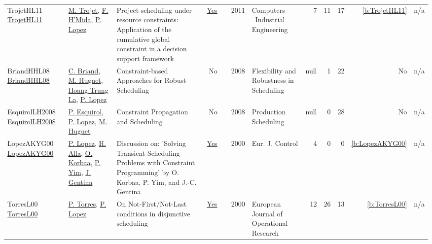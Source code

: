 {\begin{longtable}{>{\raggedright\arraybackslash}p{3cm}>{\raggedright\arraybackslash}p{6cm}>{\raggedright\arraybackslash}p{6.5cm}rrrp{2.5cm}rrrrr}
TrojetHL11 \href{https://doi.org/10.1016/j.cie.2010.08.014}{TrojetHL11} & \hyperref[auth:a711]{M. Trojet}, \hyperref[auth:a712]{F. H'Mida}, \hyperref[auth:a3]{P. Lopez} & Project scheduling under resource constraints: Application of the cumulative global constraint in a decision support framework & \href{../works/TrojetHL11.pdf}{Yes} & \cite{TrojetHL11} & 2011 & Computers \  Industrial Engineering & 7 & 11 & 17 & \ref{b:TrojetHL11} & n/a\\
BriandHHL08 \href{http://dx.doi.org/10.1002/9780470611432.ch9}{BriandHHL08} & \hyperref[auth:a1218]{C. Briand}, \hyperref[auth:a1219]{M. Huguet}, \hyperref[auth:a1220]{Hoang Trung La}, \hyperref[auth:a3]{P. Lopez} & Constraint-based Approaches for Robust Scheduling & No & \cite{BriandHHL08} & 2008 & Flexibility and Robustness in Scheduling & null & 1 & 22 & No & n/a\\
EsquirolLH2008 \href{http://dx.doi.org/10.1002/9780470611050.ch5}{EsquirolLH2008} & \hyperref[auth:a1270]{P. Esquirol}, \hyperref[auth:a3]{P. Lopez}, \hyperref[auth:a1219]{M. Huguet} & Constraint Propagation and Scheduling & No & \cite{EsquirolLH2008} & 2008 & Production Scheduling & null & 0 & 28 & No & n/a\\
LopezAKYG00 \href{https://doi.org/10.1016/S0947-3580(00)71114-9}{LopezAKYG00} & \hyperref[auth:a3]{P. Lopez}, \hyperref[auth:a689]{H. Alla}, \hyperref[auth:a686]{O. Korbaa}, \hyperref[auth:a687]{P. Yim}, \hyperref[auth:a688]{J. Gentina} & Discussion on: 'Solving Transient Scheduling Problems with Constraint Programming' by O. Korbaa, P. Yim, and {J.-C.} Gentina & \href{../works/LopezAKYG00.pdf}{Yes} & \cite{LopezAKYG00} & 2000 & Eur. J. Control & 4 & 0 & 0 & \ref{b:LopezAKYG00} & n/a\\
TorresL00 \href{http://dx.doi.org/10.1016/s0377-2217(99)00497-x}{TorresL00} & \hyperref[auth:a880]{P. Torres}, \hyperref[auth:a3]{P. Lopez} & On Not-First/Not-Last conditions in disjunctive scheduling & \href{../works/TorresL00.pdf}{Yes} & \cite{TorresL00} & 2000 & European Journal of Operational Research & 12 & 26 & 13 & \ref{b:TorresL00} & n/a\\
\end{longtable}
}

\clearpage
